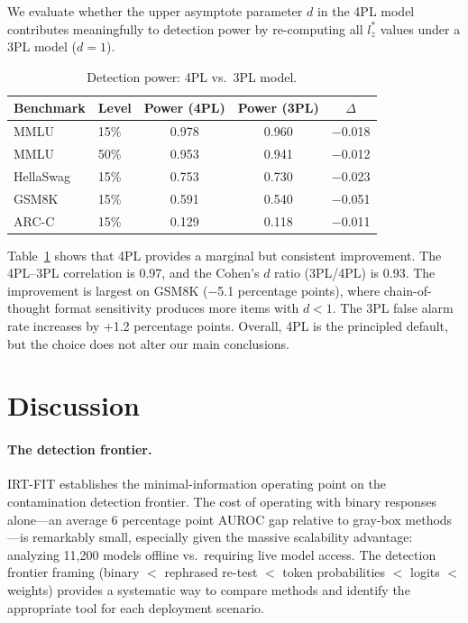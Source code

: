 \documentclass[11pt,a4paper]{article}
\begin{document}
We evaluate whether the upper asymptote parameter $d$ in the 4PL model contributes meaningfully to detection power by re-computing all $l_{z}^{*}$ values under a 3PL model ($d=1$).

\begin{table}[t]
\centering
\caption{Detection power: 4PL vs.\ 3PL model.}
\label{tab:4pl_3pl}
\begin{tabular}{llccc}
\toprule
Benchmark & Level & Power (4PL) & Power (3PL) & $\Delta$ \\
\midrule
MMLU & 15\% & 0.978 & 0.960 & $-$0.018 \\
MMLU & 50\% & 0.953 & 0.941 & $-$0.012 \\
HellaSwag & 15\% & 0.753 & 0.730 & $-$0.023 \\
GSM8K & 15\% & 0.591 & 0.540 & $-$0.051 \\
ARC-C & 15\% & 0.129 & 0.118 & $-$0.011 \\
\bottomrule
\end{tabular}
\end{table}

Table~\ref{tab:4pl_3pl} shows that 4PL provides a marginal but consistent improvement.
The 4PL--3PL correlation is 0.97, and the Cohen's $d$ ratio (3PL/4PL) is 0.93.
The improvement is largest on GSM8K ($-$5.1 percentage points), where chain-of-thought format sensitivity produces more items with $d < 1$.
The 3PL false alarm rate increases by +1.2 percentage points.
Overall, 4PL is the principled default, but the choice does not alter our main conclusions.

\section{Discussion}

\paragraph{The detection frontier.}
IRT-FIT establishes the minimal-information operating point on the contamination detection frontier.
The cost of operating with binary responses alone---an average 6 percentage point AUROC gap relative to gray-box methods---is remarkably small, especially given the massive scalability advantage: analyzing 11,200 models offline vs.\ requiring live model access.
The detection frontier framing (binary $<$ rephrased re-test $<$ token probabilities $<$ logits $<$ weights) provides a systematic way to compare methods and identify the appropriate tool for each deployment scenario.
\end{document}
